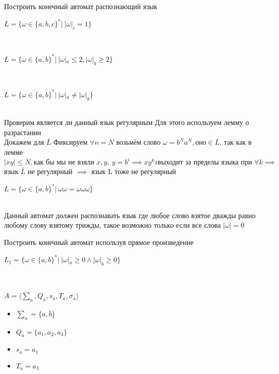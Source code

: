 \documentclass[10pt]{article}
\begin{document}
\begin{enumerate}
{\Large\item Построить конечный автомат распознающий язык}
	\begin{enumerate}[label*=\arabic*.]
		{\large\item $L=\{\omega \in \{a,b,c\}^* |\  |\omega|_c=1\}$} \\
		{\large\item $L=\{\omega \in \{a,b\}^* |\  |\omega|_a\leq2,|\omega|_b\geq2\}$}\\ 
		{\large\item $L=\{\omega \in \{a,b\}^* |\  |\omega|_a\neq|\omega|_b\}$} \\
		Проверим является ли данный язык регулярным
		Для этого используем лемму о разрастании\\
		Докажем для $\bar{L}$
		Фиксируем $\forall n=N$ возьмём слово $\omega=b^Na^N, оно \in \bar{L} $, так как в лемме $|xy|\leq N, \text{как бы мы не взяли } x , y,\ y=b^i \implies xy^kz \text{выходит за пределы языка при } 
		\forall k \implies$ язык $\bar{L}$ не регулярный $\implies$ язык L тоже не регулярный\\
		{\large\item $L=\{\omega \in \{a,b\}^* |\ \omega\omega=\omega\omega\omega\}$}\\
		Данный автомат должен распознавать язык где любое слово взятое дважды равно любому слову взятому трижды, такое возможно только если все слова $|\omega|=0$\\
	\end{enumerate}
{\Large\item Построить конечный автомат используя прямое произведение}
	\begin{enumerate}[label*=\arabic*.]
		{\large\item $L_1=\{\omega \in \{a,b\}^* |\  |\omega|_a\geq 0 \land |\omega|_b\geq 0\}$} \\
		\\
		$A=\langle \sum_a, Q_a, s_a, T_a, \sigma_a \rangle$\\
		\begin{itemize}
			\item $\sum_a=\{a,b\}$\\
			\item $Q_a=\{a_1,a_2,a_3\}$\\
			\item $s_a={a_1}$\\
			\item $T_a={a_3}$\\

\end{itemize}
\end{enumerate}
\end{enumerate}
\end{document}

